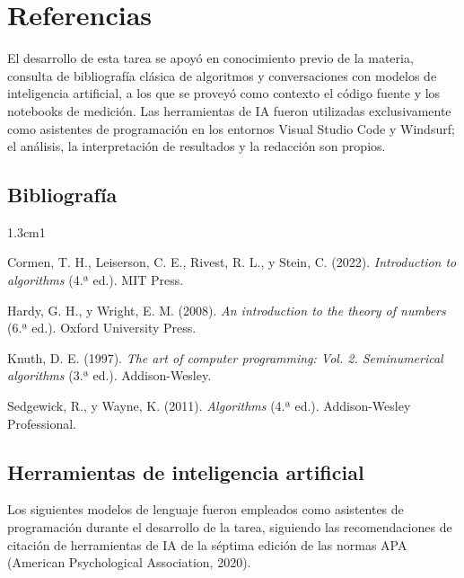 
\section{Referencias}

El desarrollo de esta tarea se apoyó en conocimiento previo de la materia, consulta de bibliografía clásica de algoritmos y conversaciones con modelos
de inteligencia artificial, a los que se proveyó como contexto el código fuente y los notebooks de medición.
Las herramientas de IA fueron utilizadas exclusivamente como asistentes de programación en los entornos Visual Studio Code y Windsurf; el análisis,
la interpretación de resultados y la redacción son propios.

\subsection{Bibliografía}

\begin{hangparas}{1.3cm}{1}

Cormen, T. H., Leiserson, C. E., Rivest, R. L., y Stein, C. (2022).
\textit{Introduction to algorithms} (4.ª ed.). MIT Press.

Hardy, G. H., y Wright, E. M. (2008).
\textit{An introduction to the theory of numbers} (6.ª ed.). Oxford University Press.

Knuth, D. E. (1997).
\textit{The art of computer programming: Vol. 2. Seminumerical algorithms}
(3.ª ed.). Addison-Wesley.

Sedgewick, R., y Wayne, K. (2011).
\textit{Algorithms} (4.ª ed.). Addison-Wesley Professional.

\end{hangparas}

\subsection{Herramientas de inteligencia artificial}

Los siguientes modelos de lenguaje fueron empleados como asistentes de
programación durante el desarrollo de la tarea, siguiendo las recomendaciones
de citación de herramientas de IA de la séptima edición de las normas APA
(American Psychological Association, 2020).

